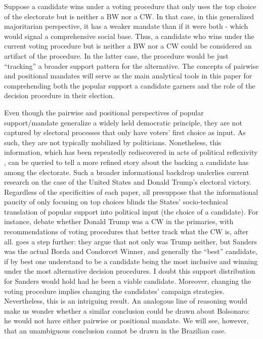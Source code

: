 \documentclass[hidelinks,11pt]{article} \usepackage[utf8]{inputenc}
\begin{document}
Suppose a candidate wins under a voting procedure that only uses the top choice of the electorate but is neither a BW nor a CW. In that case, in this generalized majoritarian perspective, it has a weaker mandate than if it were both - which would signal a comprehensive social base. Thus, a candidate who wins under the current voting procedure but is neither a BW nor a CW could be considered an artifact of the procedure. In the latter case, the procedure would be just ``tracking'' a broader support pattern for the alternative. The concepts of pairwise and positional mandates will serve as the main analytical tools in this paper for comprehending both the popular support a candidate garners and the role of the decision procedure in their election.

Even though the pairwise and positional perspectives of popular support/mandate generalize a widely held democratic principle, they are not captured by electoral processes that only have voters' first choice as input. As such, they are not typically mobilized by politicians. Nonetheless, this information, which has been repeatedly rediscovered in acts of political reflexivity \parencite{mclean14_stran_histor_social_choic_contr}, can be queried to tell a more refined story about the backing a candidate has among the electorate. Such a broader informational backdrop underlies current research on the case of the United States and Donald Trump's electoral victory. Regardless of the specificities of each paper, all presuppose that the informational paucity of only focusing on top choices blinds the States' socio-technical translation of popular support into political input (the choice of a candidate). For instance, \textcite{potthoff2021condorcet, woon2020trump, kurrild2018trump} debate whether Donald Trump was a CW in the primaries, with recommendations of voting procedures that better track what the CW is, after all. \textcite{igersheim22_compar_votin_method} goes a step further: they argue that not only was Trump neither, but Sanders was the actual Borda and Condorcet Winner, and generally the ``best'' candidate, if by best one understand to be a candidate being the most inclusive and winning under the most alternative decision procedures. I doubt this support distribution for Sanders would hold had he been a viable candidate. Moreover, changing the voting procedure implies changing the candidates' campaign strategies. Nevertheless, this is an intriguing result. An analogous line of reasoning would make us wonder whether a similar conclusion could be drawn about Bolsonaro: he would not have either pairwise or positional mandate. We will see, however, that an unambiguous conclusion cannot be drawn in the Brazilian case.
\end{document}
